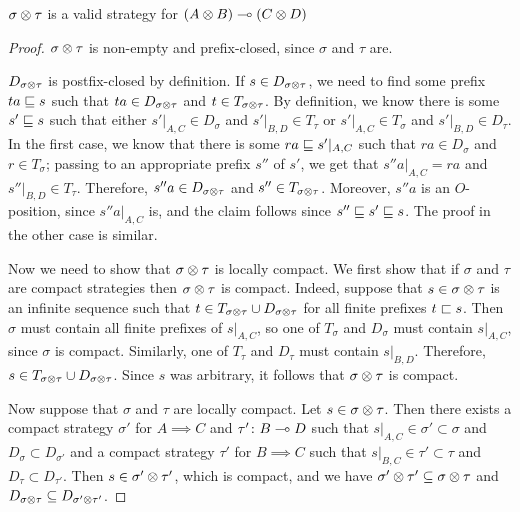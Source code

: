 \documentclass{article}
\begin{document}
\begin{proposition}
  $\sigma\otimes\tau$ is a valid strategy for $(A\otimes B)\multimap (C\otimes D)$
  \begin{proof}
    $\sigma\otimes\tau$ is non-empty and prefix-closed, since $\sigma$ and $\tau$ are.  
    
    $D_{\sigma\otimes\tau}$ is postfix-closed by definition.  If $s\in D_{\sigma\otimes\tau}$, we need to find some prefix $ta\sqsubseteq s$ such that $ta\in D_{\sigma\otimes\tau}$ and $t\in T_{\sigma\otimes\tau}$.  By definition, we know there is some $s'\sqsubseteq s$ such that either $s'\vert_{A,C}\in D_\sigma$ and $s'\vert_{B,D}\in T_\tau$ or $s'\vert_{A,C}\in T_\sigma$ and $s'\vert_{B,D}\in D_\tau$.  In the first case, we know that there is some $ra\sqsubseteq s'\vert_{A,C}$ such that $ra\in D_\sigma$ and $r\in T_\sigma$; passing to an appropriate prefix $s''$ of $s'$, we get that $s''a\vert_{A,C}=ra$ and $s''\vert_{B,D}\in T_\tau$.  Therefore, $s''a\in D_{\sigma\otimes\tau}$ and $s''\in T_{\sigma\otimes\tau}$.  Moreover, $s''a$ is an $O$-position, since $s''a\vert_{A,C}$ is, and the claim follows since $s''\sqsubseteq s'\sqsubseteq s$.  The proof in the other case is similar.

    Now we need to show that $\sigma\otimes\tau$ is locally compact.  We first show that if $\sigma$ and $\tau$ are compact strategies then $\sigma\otimes\tau$ is compact.  Indeed, suppose that $s\in\sigma\otimes\tau$ is an infinite sequence such that $t\in T_{\sigma\otimes\tau}\cup D_{\sigma\otimes\tau}$ for all finite prefixes $t\sqsubset s$.  Then $\sigma$ must contain all finite prefixes of $s\vert_{A,C}$, so one of $T_\sigma$ and $D_\sigma$ must contain $s\vert_{A,C}$, since $\sigma$ is compact.  Similarly, one of $T_{\tau}$ and $D_\tau$ must contain $s\vert_{B,D}$.  Therefore, $s\in T_{\sigma\otimes\tau}\cup D_{\sigma\otimes\tau}$.  Since $s$ was arbitrary, it follows that $\sigma\otimes\tau$ is compact.  

    Now suppose that $\sigma$ and $\tau$ are locally compact.  Let $s\in\sigma\otimes\tau$.  Then there exists a compact strategy $\sigma'$ for $A\implies C$ and $\tau'\colon B\multimap D$ such that $s\vert_{A,C}\in\sigma'\subset\sigma$ and $D_\sigma\subset D_{\sigma'}$ and a compact strategy $\tau'$ for $B\implies C$ such that $s\vert_{B,C}\in\tau'\subset \tau$ and $D_\tau\subset D_{\tau'}$.  Then $s\in\sigma'\otimes\tau'$, which is compact, and we have $\sigma'\otimes\tau'\subseteq\sigma\otimes\tau$ and $D_{\sigma\otimes\tau}\subseteq D_{\sigma'\otimes\tau'}$.


\end{proof}
\end{proposition}
\end{document}
